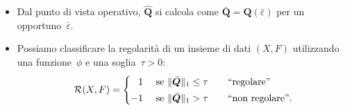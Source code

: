 \documentclass[10pt]{beamer}
\theoremstyle{definition}
\theoremstyle{plain}
\def\Cal#1{{\cal #1}}
\def\norm#1{\Vert #1\Vert}
\def\hbyw#1#2{\vbox to #1{\vfil \hbox to #2{\hfil}}}
\begin{document}
\begin{frame}

\bigskip
\begin{itemize}
\item
Dal punto di vista operativo, $\widehat{\bm Q}$ si calcola come $\bar{\bm Q} = \bm Q(\bar\varepsilon)$ per un opportuno~$\bar\varepsilon$.

\bigskip\medskip

\item
Possiamo classificare la regolarità di un insieme di dati $(X,F)$ utilizzando una funzione~$\phi$ e una soglia~$\tau>0$:
$$
\Cal R(X, F) = \begin{cases}
				\phantom{-}1& \text{ se $\norm{\bar{\bm Q}}_1 \leq \tau$\qquad “regolare”} \\
				-1& \text{ se $\norm{\hbyw{3ex}{0em}\bar{\bm Q}}_1 > \tau$\qquad “non regolare”}. 
			   \end{cases}
$$
\end{itemize}


\end{frame}



\end{document}
